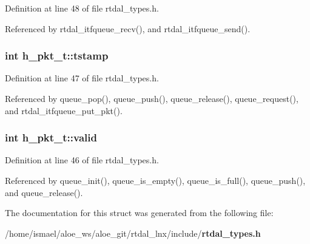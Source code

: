 Definition at line 48 of file rtdal\-\_\-types.\-h.



Referenced by rtdal\-\_\-itfqueue\-\_\-recv(), and rtdal\-\_\-itfqueue\-\_\-send().

\subsubsection[{tstamp}]{\setlength{\rightskip}{0pt plus 5cm}int h\-\_\-pkt\-\_\-t\-::tstamp}\label{structh__pkt__t_ae070e54c9d97e14e9f287f60d40fc396}


Definition at line 47 of file rtdal\-\_\-types.\-h.



Referenced by queue\-\_\-pop(), queue\-\_\-push(), queue\-\_\-release(), queue\-\_\-request(), and rtdal\-\_\-itfqueue\-\_\-put\-\_\-pkt().

\subsubsection[{valid}]{\setlength{\rightskip}{0pt plus 5cm}int h\-\_\-pkt\-\_\-t\-::valid}\label{structh__pkt__t_aeac463c0bd25687855d0df70f0e7a0ff}


Definition at line 46 of file rtdal\-\_\-types.\-h.



Referenced by queue\-\_\-init(), queue\-\_\-is\-\_\-empty(), queue\-\_\-is\-\_\-full(), queue\-\_\-push(), and queue\-\_\-release().



The documentation for this struct was generated from the following file\-:\begin{DoxyCompactItemize}
\item 
/home/ismael/aloe\-\_\-ws/aloe\-\_\-git/rtdal\-\_\-lnx/include/{\bf rtdal\-\_\-types.\-h}\end{DoxyCompactItemize}
